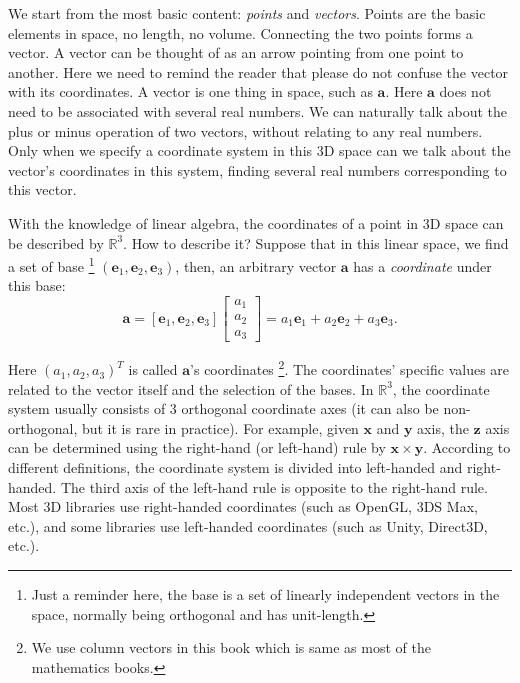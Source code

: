 We start from the most basic content: \textit{points} and \textit{vectors}. Points are the basic elements in space, no length, no volume. Connecting the two points forms a vector. A vector can be thought of as an arrow pointing from one point to another. Here we need to remind the reader that please do not confuse the vector with its coordinates. A vector is one thing in space, such as $ \mathbf{a}$. Here $ \mathbf{a} $ does not need to be associated with several real numbers. We can naturally talk about the plus or minus operation of two vectors, without relating to any real numbers. Only when we specify a coordinate system in this 3D space can we talk about the vector's coordinates in this system, finding several real numbers corresponding to this vector.

With the knowledge of linear algebra, the coordinates of a point in 3D space can be described by $ \mathbb{R}^3$. How to describe it? Suppose that in this linear space, we find a set of base \footnote{Just a reminder here, the base is a set of linearly independent vectors in the space, normally being orthogonal and has unit-length.} $ (\mathbf{e}_1,\mathbf{e}_2,\mathbf{e}_3) $, then, an arbitrary vector $ \mathbf{a} $ has a \textit{coordinate} under this base:
\begin{equation}
\mathbf{a} = \left[ {{\mathbf{e}_1},{\mathbf{e}_2},{\mathbf{e}_3}} \right]\left[ \begin{array}{l}
{a_1}\\
{a_2}\\
{a_3}
\end{array} \right] = {a_1}{\mathbf{e}_1} + {a_2}{\mathbf{e}_2} + {a_3}{\mathbf{e}_3}.
\end{equation}

Here $ (a_ 1, a_ 2, a_ 3 )^{T} $ is called $\mathbf {a}$'s coordinates \footnote {We use column vectors in this book which is same as most of the  mathematics books.}. The coordinates' specific values are related to the vector itself and the selection of the bases. In $\mathbb{R}^3$, the coordinate system usually consists of 3 orthogonal coordinate axes (it can also be non-orthogonal, but it is rare in practice). For example, given $ \mathbf {x} $ and $ \mathbf {y} $ axis, the $ \mathbf {z} $ axis can be determined using the right-hand (or left-hand) rule by $ \mathbf {x} \times  \mathbf {y} $. According to different definitions, the coordinate system is divided into left-handed and right-handed. The third axis of the left-hand rule is opposite to the right-hand rule. Most 3D libraries use right-handed coordinates (such as OpenGL, 3DS Max, etc.), and some libraries use left-handed coordinates (such as Unity, Direct3D, etc.).

